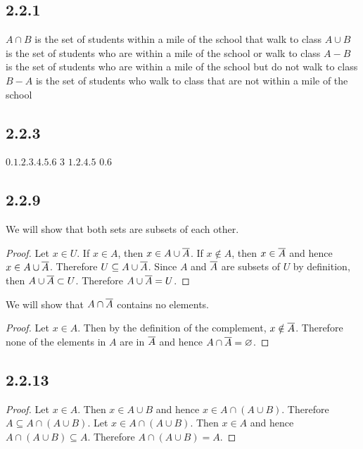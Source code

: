 \documentclass[12pt,titlepage]{extarticle}
\begin{document}
\subsection*{2.2.1}
\begin{tasks}
    \task $A \cap B$ is the set of students within a mile of the school that walk to class 
    \task $A \cup B$ is the set of students who are within a mile of the school or walk to class
    \task $A - B$ is the set of students who are within a mile of the school but do not walk to class
    \task $B - A$ is the set of students who walk to class that are not within a mile of the school
\end{tasks}

\subsection*{2.2.3}
\begin{tasks}
    \task $\qty{0,1,2,3,4,5,6}$
    \task $\qty{3}$
    \task $\qty{1,2,4,5}$
    \task $\qty{0,6}$
\end{tasks}

\subsection*{2.2.9}
\begin{tasks}
    \task We will show that both sets are subsets of each other.
    \begin{proof}
        Let $x \in U$. If $x \in A$, then $x \in A \cup \overline{A}$. If $x \notin A$, then $x \in \overline{A}$ and hence $x \in A \cup \overline{A}$. Therefore $U \subseteq A \cup \overline{A}$. Since $A$ and $\overline{A}$ are subsets of $U$ by definition, then $A \cup \overline{A} \subset U$. Therefore $A \cup \overline{A} = U$.
    \end{proof}
    \task We will show that $A \cap \overline{A}$ contains no elements.
    \begin{proof}
        Let $x \in A$. Then by the definition of the complement, $x \notin \overline{A}$. Therefore none of the elements in $A$ are in  $\overline{A}$ and hence $A \cap \overline{A} = \varnothing$.
    \end{proof}
\end{tasks}

\subsection*{2.2.13}
\begin{proof}
    Let $x \in A$. Then $x \in A \cup B$ and hence $x \in A \cap (A \cup B)$. Therefore $A \subseteq A \cap (A \cup B)$. Let $x \in A \cap (A \cup B)$. Then $x \in A$ and hence $A \cap (A \cup B) \subseteq A$. Therefore $A \cap (A \cup B) = A$.
\end{proof}
\end{document}
